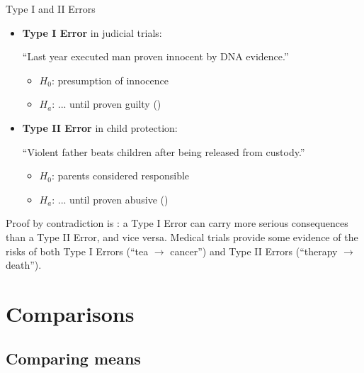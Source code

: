 \documentclass{beamer}
\begin{document}
	\begin{frame}[t]{Type I and II Errors}
			
		\begin{itemize}

			\item \textbf{Type I Error} in judicial trials:\vspace{.5em}
			
			``Last year executed man proven innocent by DNA evidence.''
			
				\begin{itemize}
					\item $H_0$: presumption of innocence
					\item $H_a$: ... until proven guilty ()
				\end{itemize}
			
			\item \textbf{Type II Error} in child protection:\vspace{.5em}
			
			``Violent father beats children after being released from custody.''
			
				\begin{itemize}
					\item $H_0$: parents considered responsible
					\item $H_a$: ... until proven abusive ()
				\end{itemize}
		\end{itemize}

		Proof by contradiction is : a Type I Error can carry more serious consequences than a Type II Error, and vice versa.\vspace{1em}
		Medical trials provide some evidence of the risks of both Type I Errors (``tea $\rightarrow$ cancer'') and Type II Errors (``therapy $\rightarrow$ death'').
	\end{frame}	

	\section{Comparisons}

	\subsection{Comparing means}
\end{document}
